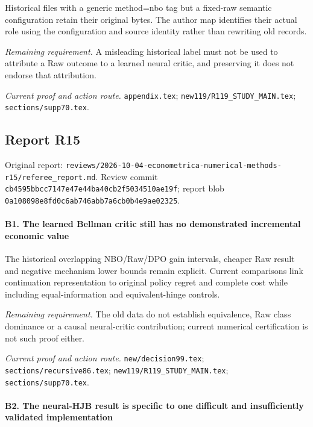 Historical files with a generic method=nbo tag but a fixed-raw semantic configuration retain their original bytes. The author map identifies their actual role using the configuration and source identity rather than rewriting old records.

\par\emph{Remaining requirement.} A misleading historical label must not be used to attribute a Raw outcome to a learned neural critic, and preserving it does not endorse that attribution.

\par\emph{Current proof and action route.} \nolinkurl{appendix.tex}; \nolinkurl{new119/R119_STUDY_MAIN.tex}; \nolinkurl{sections/supp70.tex}.

\subsection{Report R15}

Original report: \nolinkurl{reviews/2026-10-04-econometrica-numerical-methods-r15/referee_report.md}. Review commit \nolinkurl{cb4595bbcc7147e47e44ba40cb2f5034510ae19f}; report blob \nolinkurl{0a108098e8fd0c6ab746abb7a6cb0b4e9ae02325}.

\paragraph{B1. The learned Bellman critic still has no demonstrated incremental economic value}

The historical overlapping NBO/\allowbreak{}Raw/\allowbreak{}DPO gain intervals, cheaper Raw result and negative mechanism lower bounds remain explicit. Current comparisons link continuation representation to original policy regret and complete cost while including equal-information and equivalent-hinge controls.

\par\emph{Remaining requirement.} The old data do not establish equivalence, Raw class dominance or a causal neural-critic contribution; current numerical certification is not such proof either.

\par\emph{Current proof and action route.} \nolinkurl{new/decision99.tex}; \nolinkurl{sections/recursive86.tex}; \nolinkurl{new119/R119_STUDY_MAIN.tex}; \nolinkurl{sections/supp70.tex}.

\paragraph{B2. The neural-HJB result is specific to one difficult and insufficiently validated implementation}

